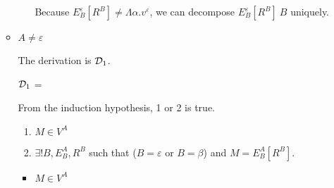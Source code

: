 \begin{itemize}
\begin{itemize}
\begin{itemize}
	      	      	      Because $ E^\varepsilon_B[R^B] \neq \Lambda\alpha.v^\varepsilon$, we can decompose $E^\varepsilon_B[R^B]\ B$ uniquely.
	      	      \end{itemize}
	      	      	      	      	      	      	      	      	      	      	      	      	      	      	      	      	      	      	      	      		      	      	      	      	      	      	      	      
	      	\item $ A \neq \varepsilon $
	      	      	      	      	      	      	      	      	      	      	      	      	      	      	      	      	      	      	      	      		      	      	      	      	      	      	      	      
	      	      The derivation is $\mathcal{D}_1$.
	      	      	      	      	      	      	      	      	      	      	      	      	      	      	      	      	      	      	      	      		      	      	      	      	      	      	      	      
	      	      $\mathcal{D}_1$ = 
	      	      {}
	      	      	      	      	      	      	      	      	      	      	      	      	      	      	      	      	      	      	      	      		      	      	      	      	      	      	      	      
	      	      From the induction hypothesis, 1 or 2 is true.
	      	      	      	      	      	      	      	      	      	      	      	      	      	      	      	      	      	      	      	      		      	      	      	      	      	      	      	      
	      	      \begin{enumerate}
	      	      	\item $ M \in V^A$
	      	      	\item $\exists ! B, E^A_B, R^B$ such that ($B = \varepsilon$ or $B = \beta$) and $M = E^A_B[R^B]$.
	      	      \end{enumerate}
	      	      	      	      	      	      	      	      	      	      	      	      	      	      	      	      	      	      	      	      		      	      	      	      	      	      	      	      
	      	      \begin{itemize}
	      	      	\item $ M \in V^A$
	      	      	      	      	      	      	      	      	      	      	      	      	      	      	      	      	      	      	      	      	      	      	      	      	      	      	      	      	      	      		      	      	      	      	      	      	      	      	      	      	      	      

\end{itemize}
\end{itemize}
\end{itemize}
